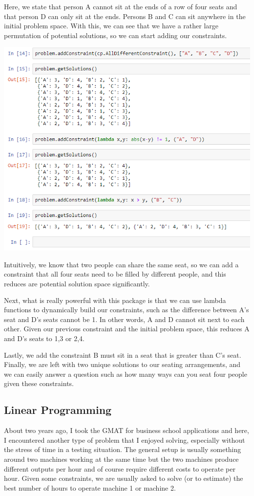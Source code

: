 \documentclass[a4paper,10pt]{extarticle}
\begin{document}
\begin{multicols}{2}
            \noindet
            Here, we state that person A cannot sit at the ends of a row of four seats and that person D can only sit at the ends. Persons B and C can sit anywhere in the initial problem space. With this, we can see that we have a rather large permutation of potential solutions, so we can start adding our constraints. 

            \includegraphics[scale=0.4]{screen4.png}
            \smallskip

            Intuitively, we know that two people can share the same seat, so we can add a constraint that all four seats need to be filled by different people, and this reduces are potential solution space significantly. 

            Next, what is really powerful with this package is that we can use lambda functions to dynamically build our constraints, such as the difference between A's seat and D's seats cannot be 1. In other words, A and D cannot sit next to each other. Given our previous constraint and the initial problem space, this reduces A and D's seats to {1,3} or {2,4}. 

            Lastly, we add the constraint B must sit in a seat that is greater than C's seat. Finally, we are left with two unique solutions to our seating arrangements, and we can easily answer a question such as how many ways can you seat four people given these constraints. 


            \subsection{Linear Programming}
            About two years ago, I took the GMAT for business school applications and here, I encountered another type of problem that I enjoyed solving, especially without the stress of time in a testing situation. The general setup is usually something around two machines working at the same time but the two machines produce different outputs per hour and of course require different costs to operate per hour. Given some constraints, we are usually asked to solve (or to estimate) the best number of hours to operate machine 1 or machine 2. 


\end{multicols}
\end{document}

